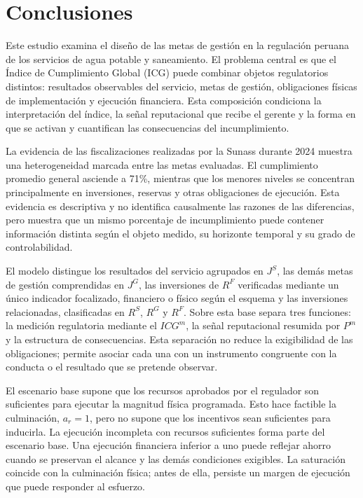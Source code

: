 \section{Conclusiones}

Este estudio examina el diseño de las metas de gestión en la regulación peruana de los servicios de agua potable y saneamiento. El problema central es que el Índice de Cumplimiento Global (ICG) puede combinar objetos regulatorios distintos: resultados observables del servicio, metas de gestión, obligaciones físicas de implementación y ejecución financiera. Esta composición condiciona la interpretación del índice, la señal reputacional que recibe el gerente y la forma en que se activan y cuantifican las consecuencias del incumplimiento.

La evidencia de las fiscalizaciones realizadas por la Sunass durante 2024 muestra una heterogeneidad marcada entre las metas evaluadas. El cumplimiento promedio general asciende a 71\%, mientras que los menores niveles se concentran principalmente en inversiones, reservas y otras obligaciones de ejecución. Esta evidencia es descriptiva y no identifica causalmente las razones de las diferencias, pero muestra que un mismo porcentaje de incumplimiento puede contener información distinta según el objeto medido, su horizonte temporal y su grado de controlabilidad.

El modelo distingue los resultados del servicio agrupados en \(J^{S}\), las demás metas de gestión comprendidas en \(J^{G}\), las inversiones de \(R^{F}\) verificadas mediante un único indicador focalizado, financiero o físico según el esquema y las inversiones relacionadas, clasificadas en \(R^{S}\), \(R^{G}\) y \(R^{F}\). Sobre esta base separa tres funciones: la medición regulatoria mediante el \(ICG^m\), la señal reputacional resumida por \(P^m\) y la estructura de consecuencias. Esta separación no reduce la exigibilidad de las obligaciones; permite asociar cada una con un instrumento congruente con la conducta o el resultado que se pretende observar.

El escenario base supone que los recursos aprobados por el regulador son suficientes para ejecutar la magnitud física programada. Esto hace factible la culminación, \(a_r=1\), pero no supone que los incentivos sean suficientes para inducirla. La ejecución incompleta con recursos suficientes forma parte del escenario base. Una ejecución financiera inferior a uno puede reflejar ahorro cuando se preservan el alcance y las demás condiciones exigibles. La saturación coincide con la culminación física; antes de ella, persiste un margen de ejecución que puede responder al esfuerzo.

